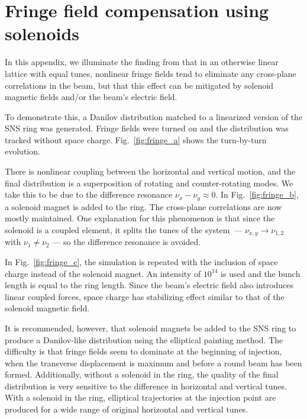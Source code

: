 \chapter{Fringe field compensation using solenoids} \label{app-C}

In this appendix, we illuminate the finding from \cite{Holmes2018} that in an otherwise linear lattice with equal tunes, nonlinear fringe fields tend to eliminate any cross-plane correlations in the beam, but that this effect can be mitigated by solenoid magnetic fields and/or the beam's electric field.

To demonstrate this, a Danilov distribution matched to a linearized version of the SNS ring was generated. Fringe fields were turned on and the distribution was tracked without space charge. Fig.~\ref{fig:fringe_a} shows the turn-by-turn evolution.

There is nonlinear coupling between the horizontal and vertical motion, and the final distribution is a superposition of rotating and counter-rotating modes. We take this to be due to the difference resonance $\nu_x - \nu_y \approx 0$. In Fig.~\ref{fig:fringe_b}, a solenoid magnet is added to the ring. The cross-plane correlations are now mostly maintained. One explanation for this phenomenon is that since the solenoid is a coupled element, it splits the tunes of the system — $\nu_{x, y} \rightarrow \nu_{1, 2}$ with $\nu_1 \ne \nu_2$ — so the difference resonance is avoided.

In Fig.~\ref{fig:fringe_c}, the simulation is repeated with the inclusion of space charge instead of the solenoid magnet. An intensity of $10^{14}$ is used and the bunch length is equal to the ring length. Since the beam's electric field also introduces linear coupled forces, space charge has stabilizing effect similar to that of the solenoid magnetic field.

It is recommended, however, that solenoid magnets be added to the SNS ring to produce a Danilov-like distribution using the elliptical painting method. The difficulty is that fringe fields seem to dominate at the beginning of injection, when the transverse displacement is maximum and before a round beam has been formed. Additionally, without a solenoid in the ring, the quality of the final distribution is very sensitive to the difference in horizontal and vertical tunes. With a solenoid in the ring, elliptical trajectories at the injection point are produced for a wide range of original horizontal and vertical tunes. 


